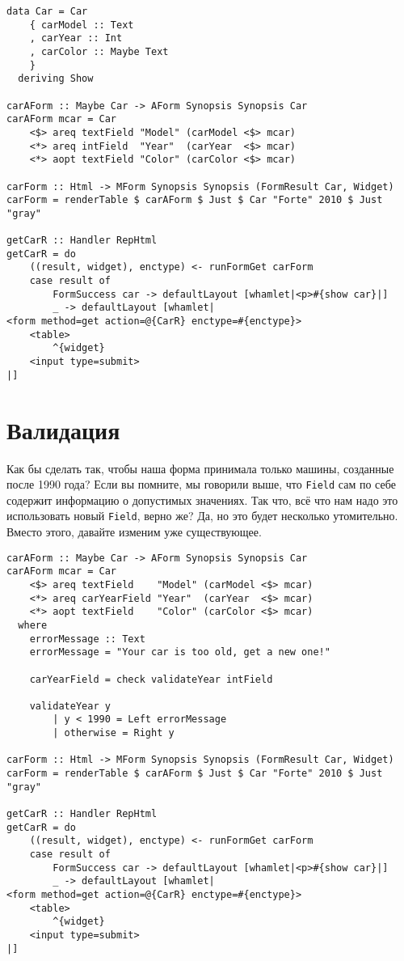 \begin{lstlisting}[caption={Опциональные поля по умолчанию}]
data Car = Car
    { carModel :: Text
    , carYear :: Int
    , carColor :: Maybe Text
    }
  deriving Show

carAForm :: Maybe Car -> AForm Synopsis Synopsis Car
carAForm mcar = Car
    <$> areq textField "Model" (carModel <$> mcar)
    <*> areq intField  "Year"  (carYear  <$> mcar)
    <*> aopt textField "Color" (carColor <$> mcar)

carForm :: Html -> MForm Synopsis Synopsis (FormResult Car, Widget)
carForm = renderTable $ carAForm $ Just $ Car "Forte" 2010 $ Just "gray"

getCarR :: Handler RepHtml
getCarR = do
    ((result, widget), enctype) <- runFormGet carForm
    case result of
        FormSuccess car -> defaultLayout [whamlet|<p>#{show car}|]
        _ -> defaultLayout [whamlet|
<form method=get action=@{CarR} enctype=#{enctype}>
    <table>
        ^{widget}
    <input type=submit>
|]
\end{lstlisting}

\section{Валидация}
Как бы сделать так, чтобы наша форма принимала только машины, созданные после 1990 года?
Если вы помните, мы говорили выше, что \lstinline'Field' сам по себе содержит информацию 
о допустимых значениях. Так что, всё что нам надо это использовать новый
\lstinline'Field', верно же? Да, но это будет несколько утомительно. Вместо этого,
давайте изменим уже существующее.
\begin{lstlisting}
carAForm :: Maybe Car -> AForm Synopsis Synopsis Car
carAForm mcar = Car
    <$> areq textField    "Model" (carModel <$> mcar)
    <*> areq carYearField "Year"  (carYear  <$> mcar)
    <*> aopt textField    "Color" (carColor <$> mcar)
  where
    errorMessage :: Text
    errorMessage = "Your car is too old, get a new one!"

    carYearField = check validateYear intField

    validateYear y
        | y < 1990 = Left errorMessage
        | otherwise = Right y

carForm :: Html -> MForm Synopsis Synopsis (FormResult Car, Widget)
carForm = renderTable $ carAForm $ Just $ Car "Forte" 2010 $ Just "gray"

getCarR :: Handler RepHtml
getCarR = do
    ((result, widget), enctype) <- runFormGet carForm
    case result of
        FormSuccess car -> defaultLayout [whamlet|<p>#{show car}|]
        _ -> defaultLayout [whamlet|
<form method=get action=@{CarR} enctype=#{enctype}>
    <table>
        ^{widget}
    <input type=submit>
|]
\end{lstlisting}

